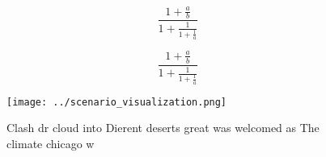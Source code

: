 \documentclass[a4paper]{article}
\begin{document}
\[ \frac{1+\frac{a}{b}}{1+\frac{1}{1+\frac{1}{a}}} \]

\[ \frac{1+\frac{a}{b}}{1+\frac{1}{1+\frac{1}{a}}} \]

\begin{figure}
\centering
\texttt{[image: ../scenario\_visualization.png]}
\caption{Clash dr cloud into Dierent deserts great was welcomed as The climate chicago w
}
\end{figure}
 
\end{document}
